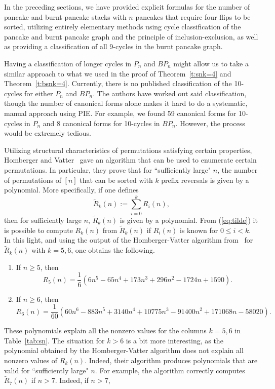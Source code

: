 \documentclass[final]{dmtcs-episciences}
\numberwithin{equation}{section}
\begin{document}
In the preceding sections, we have provided explicit formulas for the number of pancake and burnt pancake stacks with $n$ pancakes that require four flips to be sorted, utilizing entirely elementary methods using cycle classification of the pancake and burnt pancake graph and the principle of inclusion-exclusion, as well as providing a classification of all 9-cycles in the burnt pancake graph. 

Having a classification of longer cycles in $P_n$ and $BP_n$ might allow us to take a similar approach to what we used in the proof of Theorem~\ref{t:snk=4} and Theorem~\ref{t:bsnk=4}. Currently, there is no published classification of the 10-cycles for either $P_n$ and $BP_n$. The authors have worked out said classification, though the number of canonical forms alone makes it hard to do a systematic, manual approach using PIE. For example, we found 59 canonical forms for 10-cycles in $P_n$ and 8 canonical forms for 10-cycles in $BP_n$. However, the process would be extremely tedious. 

Utilizing structural characteristics of permutations satisfying certain properties, Homberger and Vatter~\cite{HV16} gave an algorithm that can be used to enumerate certain permutations. In particular, they prove that for ``sufficiently large" $n$, the number of permutations of $[n]$ that can be sorted with $k$ prefix reversals is given by a polynomial. More specifically, if one defines
\begin{equation}\label{eq:tilde}
\widetilde{R}_k(n):=\sum_{i=0}^kR_i(n),
\end{equation} then for sufficiently large $n$, $\widetilde{R}_k(n)$ is given by a polynomial. From (\ref{eq:tilde}) it is possible to compute $R_k(n)$ from $\widetilde{R}_k(n)$ if $R_i(n)$ is known for $0\leq i<k$. In this light, and using the output of the Homberger-Vatter algorithm from~\cite{HV16} for $\widetilde{R}_k(n)$ with $k=5,6$, one obtains the following.
\begin{enumerate}
    \item If $n\geq 5$, then 
\begin{displaymath}R_5(n)= \frac{1}{6}\left(6n^5-65n^4+173n^3+296n^2-1724n+1590\right).\end{displaymath}
    \item If $n\geq6$, then
    \begin{displaymath}R_6(n)= \frac{1}{60}\left(60n^6 - 883n^5 + 3140n^4 + 10775 n^3 - 91400 n^2 + 171068n -58020\right).\end{displaymath}
\end{enumerate} These polynomials explain all the nonzero values for the columns $k=5,6$ in Table~\ref{tab:sn}. The situation for $k>6$ is a bit more interesting, as the polynomial obtained by the Homberger-Vatter algorithm does not explain all nonzero values of $R_k(n)$. Indeed, their algorithm produces polynomials that are valid for ``sufficiently large" $n$. For example, the algorithm correctly computes $\widetilde{R}_7(n)$ if $n>7$. Indeed, if $n>7$, 
\end{document}
